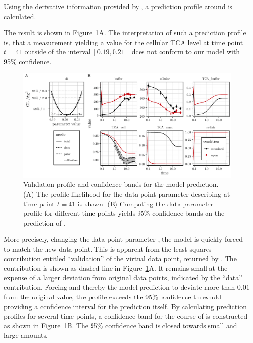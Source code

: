 \documentclass[article]{jss}
\begin{document}
Using the derivative information provided by , a
prediction profile around  is calculated.
\begin{CodeChunk}
\end{CodeChunk}
%
The result is shown in Figure~\ref{fig:validation}A. The interpretation of
such a prediction profile is, that a measurement yielding a value for the
cellular TCA level at time point $t=41$ outside of the interval $[0.19,0.21]$
does not conform to our model with 95\% confidence.

\begin{figure}[t!]
\centering
\includegraphics[width = \textwidth]{Figures/figure9}
\caption{Validation profile and confidence bands for the model prediction.
(A) The profile likelihood for the data point parameter  describing
 at time point $t = 41$ is shown. (B) Computing the data
parameter profile for different time points yields 95\% confidence bands on the
prediction of .
\label{fig:validation}}
\end{figure}

More precisely, changing the data-point parameter , the model is quickly forced to
match the new data point. This is apparent from the least squares contribution entitled ``validation'' of the virtual data point, returned by . 
The contribution is shown as dashed line in Figure~\ref{fig:validation}A. It remains small at the expense of a larger deviation from original data points, indicated by the ``data'' contribution. 
Forcing  and thereby the model
prediction to deviate more than $0.01$ from the original value, the profile
exceeds the 95\% confidence threshold providing a confidence interval for the
prediction itself. By calculating
prediction profiles for several time points, a confidence band for the course of
 is constructed as shown in Figure~\ref{fig:validation}B. The
95\% confidence band is closed towards small and large amounts.
\end{document}
